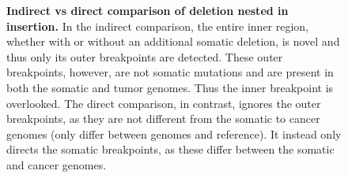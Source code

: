 \documentclass{easychithesis}
\begin{document}
\begin{figure}[ht]
\centering
{}
\quad
{}
%
\caption{{\bf Indirect vs direct comparison of deletion nested in insertion.} In the indirect comparison, the entire inner region, whether with or without an additional somatic deletion, is novel and thus only its outer breakpoints are detected. These outer breakpoints, however, are not somatic mutations and are present in both the somatic and tumor genomes. Thus the inner breakpoint is overlooked. The direct comparison, in contrast, ignores the outer breakpoints, as they are not different from the somatic to cancer genomes (only differ between genomes and reference). It instead only directs the somatic breakpoints, as these differ between the somatic and cancer genomes.}
\label{fig:NestedDeletion}
\end{figure}
\end{document}
